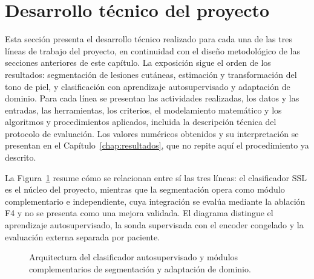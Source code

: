 \section{Desarrollo técnico del proyecto}\label{sec:desarrollo-tecnico}

Esta sección presenta el desarrollo técnico realizado para cada una de las tres líneas de trabajo del proyecto, en continuidad con el diseño metodológico de las secciones anteriores de este capítulo. La exposición sigue el orden de los resultados: segmentación de lesiones cutáneas, estimación y transformación del tono de piel, y clasificación con aprendizaje autosupervisado y adaptación de dominio. Para cada línea se presentan las actividades realizadas, los datos y las entradas, las herramientas, los criterios, el modelamiento matemático y los algoritmos y procedimientos aplicados, incluida la descripción técnica del protocolo de evaluación. Los valores numéricos obtenidos y su interpretación se presentan en el Capítulo~\ref{chap:resultados}, que no repite aquí el procedimiento ya descrito.

La Figura~\ref{fig:arquitectura-modular} resume cómo se relacionan entre sí las tres líneas: el clasificador SSL es el núcleo del proyecto, mientras que la segmentación opera como módulo complementario e independiente, cuya integración se evalúa mediante la ablación F4 y no se presenta como una mejora validada. El diagrama distingue el aprendizaje autosupervisado, la sonda supervisada con el encoder congelado y la evaluación externa separada por paciente.

\begin{figure}[!htbp]
\caption{Arquitectura del clasificador autosupervisado y módulos complementarios de segmentación y adaptación de dominio.}
\label{fig:arquitectura-modular}
\centering


\par\smallskip
\begingroup\footnotesize\singlespacing\raggedright
\par{}
\par\endgroup
\end{figure}



